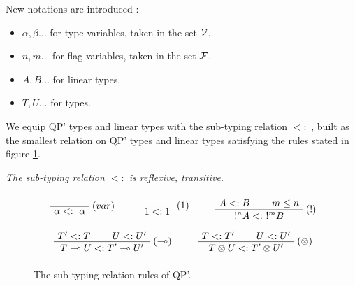 New notations are introduced :
\begin{itemize}
	\item $\alpha, \beta \dots$ for type variables, taken in the set $\mathcal{V}$.
	\item $n, m \dots$ for flag variables, taken in the set $\mathcal{F}$.
	\item $A, B \dots$ for linear types.
	\item $T, U \dots$ for types.
\end{itemize}

\begin{defn} We equip QP' types and linear types with the sub-typing relation $<:$ , built as the smallest relation on QP' types and
	linear types satisfying the rules stated in figure \ref{subtypingQP'}.
\end{defn}

\begin{lemma} \it The sub-typing relation $<:$ is reflexive, transitive.
\end{lemma}

\begin{figure}[!ht]
\begin{mdframed}
	$$ $$
	$$ \mbox{
  	\AxiomC{}
  	\RightLabel{$(var)$}
	 	\UnaryInfC{$\alpha <: ~ \alpha$}
	 	\DisplayProof
		~~
		~~
		\AxiomC{}
	 	\RightLabel{$(1)$}
	 	\UnaryInfC{$1 <: 1$}
		\DisplayProof
		~~
		~~
	 	\AxiomC{$A <: B$}
	 	\AxiomC{$m \le n$}
	 	\RightLabel{$(!)$}
	 	\BinaryInfC{$!^n A <: ~ !^m B$}
		\DisplayProof
	} $$
	$$ $$
	$$ \mbox{
	 	\AxiomC{$T' <: T$}
	 	\AxiomC{$U <: U'$}
	 	\RightLabel{$(\multimap)$}
	 	\BinaryInfC{$T \multimap U <: T' \multimap U'$}
		\DisplayProof
		~~
		~~
	 	\AxiomC{$T <: T'$}
	 	\AxiomC{$U <: U'$}
	 	\RightLabel{$(\otimes)$}
	 	\BinaryInfC{$T \otimes U <: T' \otimes U'$}
		\DisplayProof
	} $$
	$$ $$
\end{mdframed}
\caption{The sub-typing relation rules of QP'.}
\label{subtypingQP'}
\end{figure}

